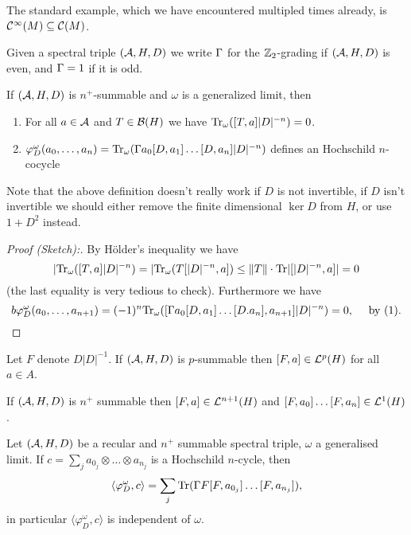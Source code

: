 \begin{example}
 The standard example, which we have encountered multipled times already, is $\mathcal{C}^\infty(M)\subseteq\mathcal{C}(M)$.
\end{example}

\noindent Given a spectral triple $(\mathcal{A},H,D)$ we write $\Gamma$ for the $\mathbb{Z}_2$-grading if $(\mathcal{A},H,D)$ is even, and $\Gamma=1$ if it is odd.

\begin{lemma}
 If $(\mathcal{A},H,D)$ is $n^+$-summable and $\omega$ is a generalized limit, then 
 \begin{enumerate}
  \item For all $a\in\mathcal{A}$ and $T\in\mathcal{B}(H)$ we have $\mathrm{Tr}_\omega([T,a]|D|^{-n})=0$.
  \item $\varphi^\omega_D(a_0,\ldots,a_n)=\mathrm{Tr}_\omega(\Gamma a_0[D,a_1]\ldots[D,a_n]|D|^{-n})$ defines an Hochschild $n$-cocycle
 \end{enumerate}
 
 \noindent Note that the above definition doesn't really work if $D$ is not invertible, if $D$ isn't invertible we should either remove the finite dimensional $\ker D$ from $H$, or use $1+D^2$ instead.
\end{lemma}

\begin{proof}[Proof (Sketch):]
 By Hölder's inequality we have $$|\mathrm{Tr}_\omega([T,a]|D|^{-n})=|\mathrm{Tr}_\omega(T[|D|^{-n},a])\leq\|T\|\cdot\mathrm{Tr}|[|D|^{-n},a]|=0$$
 (the last equality is very tedious to check). Furthermore we have
 $$b\varphi^\omega_D(a_0,\ldots,a_{n+1})=(-1)^n\mathrm{Tr}_\omega([\Gamma a_0[D,a_1]\ldots[D.a_n],a_{n+1}]|D|^{-n})=0,\quad\text{ by (1)}.$$
\end{proof}

\begin{lemma}
 Let $F$ denote $D|D|^{-1}$. If $(\mathcal{A},H,D)$ is $p$-summable then $[F,a]\in\mathcal{L}^p(H)$ for all $a\in A$.
\end{lemma}

\begin{corollary}
 If $(\mathcal{A},H,D)$ is $n^+$ summable then $[F,a]\in\mathcal{L}^{n+1}(H)$ and $[F,a_0]\ldots[F,a_n]\in\mathcal{L}^{1}(H)$.
\end{corollary}

\begin{theorem}
Let $(\mathcal{A},H,D)$ be a recular and $n^+$ summable spectral triple, $\omega$ a generalised limit. If $c=\sum_j a_{0_j}\otimes\ldots\otimes a_{n_j}$  is a Hochschild $n$-cycle, then 
$$\langle\varphi^\omega_D,c\rangle=\sum_j\mathrm{Tr}(\Gamma F[F,a_{0_j}]\ldots[F,a_{n_j}]),$$
in particular $\langle\varphi^\omega_D,c\rangle$ is independent of $\omega$.
 
\end{theorem}













